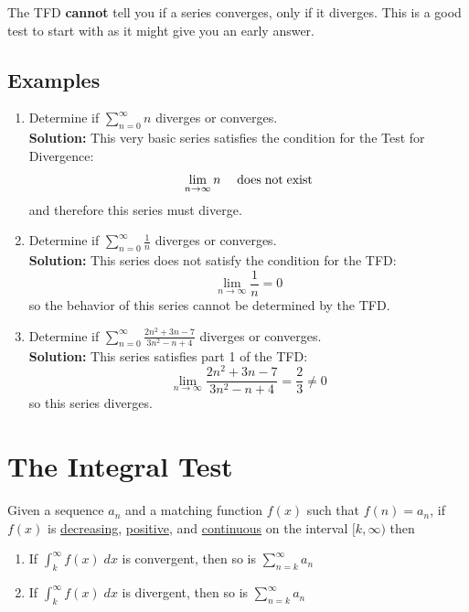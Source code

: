 \documentclass[12pt]{report}
\begin{document}
\noindent The TFD \textbf{cannot} tell you if a series converges, only if it diverges. This is a good test to start with as it might give you an early answer.

\subsection*{Examples}
\begin{enumerate}

    \item Determine if $ \sum_{n=0}^{\infty} n $ diverges or converges. \\
    
    \textbf{Solution:} This very basic series satisfies the condition for the Test for Divergence:
        $$\lim_{n\to\infty} n \quad \text{\;does\;not\;exist}$$
    and therefore this series must diverge.




    \item Determine if $ \sum_{n=0}^{\infty} \frac{1}{n} $ diverges or converges. \\ 
    
    \textbf{Solution:} This series does not satisfy the condition for the TFD:
        $$\lim_{n\to\infty} \frac{1}{n} = 0$$
    so the behavior of this series cannot be determined by the TFD.
    
    
    
    \item Determine if $ \sum_{n=0}^{\infty} \frac{2n^2 + 3n - 7}{3n^2 - n + 4} $ diverges or converges. \\
    
    \textbf{Solution:} This series satisfies part 1 of the TFD:
    	$$ \lim_{n\to\infty} \frac{2n^2 + 3n - 7}{3n^2 - n + 4} = \frac{2}{3} \neq 0 $$
    so this series diverges. 
\end{enumerate}




\clearpage





\section{The Integral Test}
Given a sequence $ a_n $ and a matching function $ f(x) $ such that $ f(n) = a_n $, if $ f(x) $ is \underline{decreasing}, \underline{positive}, and \underline{continuous} on the interval $ [k,\infty) $ then

\begin{enumerate}
	\item If $ \int_k^\infty f(x)\;dx $ is convergent, then so is $ \sum_{n=k}^{\infty} a_n $
	\item If $ \int_k^\infty f(x)\;dx $ is divergent, then so is $ \sum_{n=k}^{\infty} a_n $
\end{enumerate}
\end{document}
